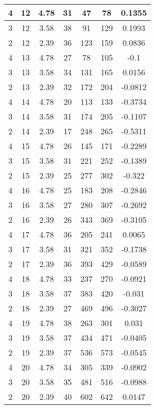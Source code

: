 \documentclass[letterpaper, 12pt]{article}
\begin{document}
\begin{longtable}{|c|c|c|c|c|c|c|}
\hline
4 & 12 & 4.78 & 31 & 47 & 78 & 0.1355 \\
\hline
3 & 12 & 3.58 & 38 & 91 & 129 & 0.1993 \\
\hline
2 & 12 & 2.39 & 36 & 123 & 159 & 0.0836 \\
\hline
4 & 13 & 4.78 & 27 & 78 & 105 & -0.1 \\
\hline
3 & 13 & 3.58 & 34 & 131 & 165 & 0.0156 \\
\hline
2 & 13 & 2.39 & 32 & 172 & 204 & -0.0812 \\
\hline
4 & 14 & 4.78 & 20 & 113 & 133 & -0.3734 \\
\hline
3 & 14 & 3.58 & 31 & 174 & 205 & -0.1107 \\
\hline
2 & 14 & 2.39 & 17 & 248 & 265 & -0.5311 \\
\hline
4 & 15 & 4.78 & 26 & 145 & 171 & -0.2289 \\
\hline
3 & 15 & 3.58 & 31 & 221 & 252 & -0.1389 \\
\hline
2 & 15 & 2.39 & 25 & 277 & 302 & -0.322 \\
\hline
4 & 16 & 4.78 & 25 & 183 & 208 & -0.2846 \\
\hline
3 & 16 & 3.58 & 27 & 280 & 307 & -0.2692 \\
\hline
2 & 16 & 2.39 & 26 & 343 & 369 & -0.3105 \\
\hline
4 & 17 & 4.78 & 36 & 205 & 241 & 0.0065 \\
\hline
3 & 17 & 3.58 & 31 & 321 & 352 & -0.1738 \\
\hline
2 & 17 & 2.39 & 36 & 393 & 429 & -0.0589 \\
\hline
4 & 18 & 4.78 & 33 & 237 & 270 & -0.0921 \\
\hline
3 & 18 & 3.58 & 37 & 383 & 420 & -0.031 \\
\hline
2 & 18 & 2.39 & 27 & 469 & 496 & -0.3027 \\
\hline
4 & 19 & 4.78 & 38 & 263 & 301 & 0.031 \\
\hline
3 & 19 & 3.58 & 37 & 434 & 471 & -0.0405 \\
\hline
2 & 19 & 2.39 & 37 & 536 & 573 & -0.0545 \\
\hline
4 & 20 & 4.78 & 34 & 305 & 339 & -0.0902 \\
\hline
3 & 20 & 3.58 & 35 & 481 & 516 & -0.0988 \\
\hline
2 & 20 & 2.39 & 40 & 602 & 642 & 0.0147 \\
\hline
\end{longtable}
\end{document}
